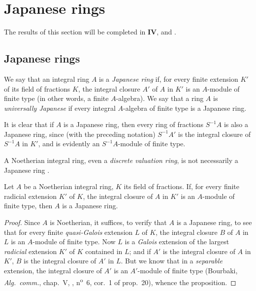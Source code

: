 \section{Japanese rings}
\label{section:0.23}

The results of this section will be completed in \textbf{IV},  and .

\subsection{Japanese rings}
\label{subsection:0.23.1}

\begin{definition}[23.1.1]
\label{0.23.1.1}
We say that an integral ring $A$ is a \emph{Japanese ring} if, for every finite extension $K'$ of its field of fractions $K$, the integral closure $A'$ of $A$ in $K'$ is
an $A$-module of finite type (in other words, a finite $A$-algebra).
We say that a ring $A$ is \emph{universally Japanese} if every integral $A$-algebra of finite type is a Japanese ring.
\end{definition}

It is clear that if $A$ is a Japanese ring, then every ring of fractions $S^{-1}A$ is also a Japanese ring, since (with the preceding notation) $S^{-1}A'$ is the integral closure of $S^{-1}A$ in $K'$, and is evidently an $S^{-1}A$-module of finite type.

A Noetherian integral ring, even a \emph{discrete valuation ring}, is not necessarily a Japanese ring \cite{IV-30}.

\begin{proposition}[23.1.2]
\label{0.23.1.2}
Let $A$ be a Noetherian integral ring, $K$ its field of fractions.
If, for every finite radicial extension $K'$ of $K$, the integral closure of $A$ in $K'$ is an $A$-module of finite type, then $A$ is a Japanese ring.
\end{proposition}

\begin{proof}
Since $A$ is Noetherian, it suffices, to verify that $A$ is a Japanese ring, to see that for every finite \emph{quasi-Galois} extension $L$ of $K$, the integral closure $B$ of $A$ in $L$ is an $A$-module of finite type.
Now $L$ is a \emph{Galois} extension of the largest \emph{radicial} extension $K'$ of $K$ contained in $L$; and if $A'$ is the integral closure of $A$ in $K'$, $B$ is the integral closure of $A'$ in $L$.
But we know that in a \emph{separable} extension, the integral closure of $A'$ is an $A'$-module of finite type (Bourbaki, \emph{Alg.~comm.}, chap.~V, , n\textsuperscript{o}~6, cor.~1 of prop.~20), whence the proposition.
\end{proof}


